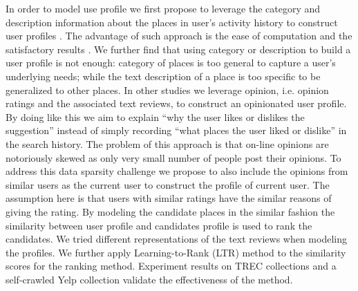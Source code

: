 In order to model use profile we first propose to leverage the 
category and description information about the places in user's activity 
history to construct user profiles \cite{udel:treccs2012}. 
The advantage of such approach is the ease of computation and the satisfactory 
results \cite{adriel:overview}. 
We further find that using category or description to build a user profile 
is not enough: category of places is too general to capture a user's 
underlying needs; while the text description of a place is too specific to 
be generalized to other places. 
In other studies 
\cite{udel:treccs2013,udel:treccs2014,udel:treccs2015,Yang:2013:OUP:2499178.2499191,Yang2015}
we leverage opinion, 
i.e. opinion ratings and the associated text reviews, to construct an 
opinionated user profile. By doing like this we aim to explain 
``why the user likes or dislikes the suggestion'' instead of simply recording 
``what places the user liked or dislike'' in the search history. 
The problem of this approach is that on-line opinions are notoriously skewed 
as only very small number of people post their opinions. 
To address this data sparsity challenge we propose to also include the 
opinions from similar users as the current user to construct the profile of 
current user. The assumption here is that users with similar ratings have 
the similar reasons of giving the rating. By modeling the candidate places 
in the similar fashion the similarity between user profile and candidates 
profile is used to rank the candidates. We tried different representations 
of the text reviews when modeling the profiles. We further apply 
Learning-to-Rank (LTR) method to the similarity scores for the ranking method. 
Experiment results on TREC collections and a self-crawled Yelp collection 
validate the effectiveness of the method.

